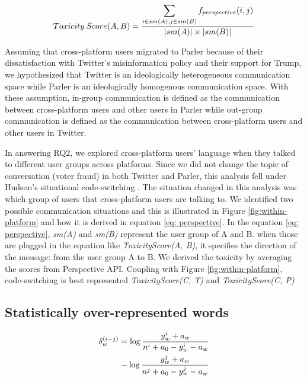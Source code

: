 \documentclass[Crown,sagev,times]{sagej}
\begin{document}
\begin{equation} 
    \centering
    Toxicity\:Score(A,B) = \frac{\displaystyle\sum_{{i} \in sm(A), {j} \in sm(B)} f_{perspective}({i},{j})}{|sm(A)| \times |sm(B)|}  
    \label{eq: perspective}
    \vspace{1mm}
  \end{equation} 

Assuming that cross-platform users migrated to Parler because of
their dissatisfaction with Twitter's misinformation policy and 
their support for Trump, we hypothesized that Twitter is
an ideologically heterogeneous communication space while Parler is
an ideologically homogenous communication space.
With these assumption, in-group communication is defined as
the communication between cross-platform users and other users in Parler
while out-group communication is defined as the communication between
cross-platform users and other users in Twitter.

In answering RQ2, we explored cross-platform users' language 
when they talked to different user groups across platforms. 
Since we did not change the topic of conversation (voter fraud) 
in both Twitter and Parler, this analysis fell under 
Hudson's situational code-switching \cite{hudson_1996}. 
The situation changed in this analysis was which group of users 
that cross-platform users are talking to. 
We identified two possible communication situations 
and this is illustrated in Figure \ref{fig:within-platform} 
and how it is derived in equation \ref{eq: perspective}. 
In the equation \ref{eq: perspective}, \emph{sm(A)} and \emph{sm(B)} 
represent the user group of A and B. when those are plugged 
in the equation like \emph{ToxicityScore(A, B)}, 
it specifies the direction of the message: from the user group A to B. 
We derived the toxicity by averaging the scores from Perspective API. 
Coupling with Figure \ref{fig:within-platform}, 
 code-switching is best represented
\emph{ToxicityScore(C, T)} and \emph{ToxicityScore(C, P)}

\subsection{Statistically over-represented words} \label{sec:statistical}

\begin{equation}
 \begin{aligned}
   \delta_{w}^{(i-j)} = \log \frac{y_{w}^{i}+a_{w}}{n^{i}+a_{0}-y_{w}^{i}-a_{w}} \\
   - \log \frac{y_{w}^{j}+a_{w}}{n^{j}+a_{0}-y_{w}^{j}-a_{w}}
 \end{aligned}
 \label{eq: log-odds ratio}
 \vspace{2mm}
\end{equation}
\end{document}
